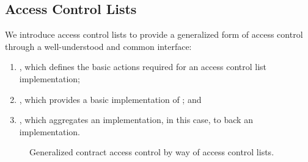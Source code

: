 \subsection{Access Control Lists}

We introduce access control lists to provide a generalized form of access
control through a well-understood and common interface:

\begin{enumerate}
  \item {}, which defines the basic actions
    required for an access control list implementation;

  \item {}, which provides a basic implementation of
    ; and

  \item {}, which aggregates an
     implementation, 
    in this case, to back an  implementation.
\end{enumerate}

\begin{figure}[H]
  \centering
  \caption{Generalized contract access control by way of access control lists.}\label{fig:acl}
\end{figure}






